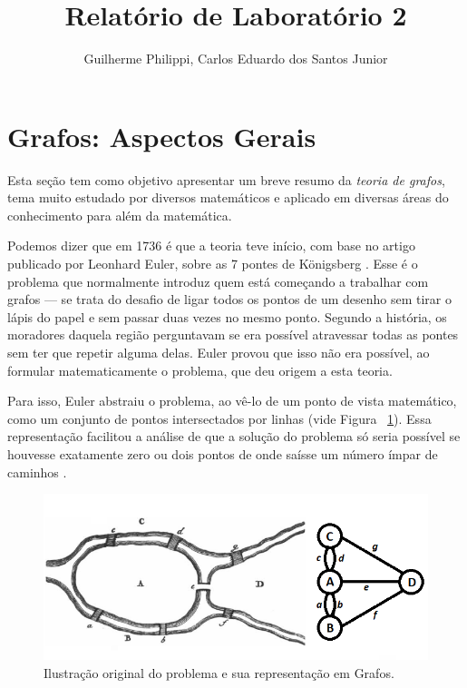\documentclass[a4paper,12pt]{article}
\title{Relatório de Laboratório 2}
\author{Guilherme Philippi, Carlos Eduardo dos Santos Junior}
\begin{document}
\maketitle
\tableofcontents

\section{Grafos: Aspectos Gerais\label{sec:grafos}}
Esta seção tem como objetivo apresentar um breve resumo da \textit{teoria de grafos}, tema muito estudado por diversos matemáticos e aplicado em diversas áreas do conhecimento para além da matemática.

Podemos dizer que em 1736 é que a teoria teve início, com base no artigo publicado por Leonhard Euler, sobre as 7 pontes de Königsberg \cite{euler:KOENIGSBERG} \cite{grafos1}. Esse é o problema que normalmente introduz quem está começando a trabalhar com grafos --- se trata do desafio de ligar todos os pontos de um desenho sem tirar o lápis do papel e sem passar duas vezes no mesmo ponto. Segundo a história, os moradores daquela região perguntavam se era possível atravessar todas as pontes sem ter que repetir alguma delas. Euler provou que isso não era possível, ao formular matematicamente o problema, que deu origem a esta teoria.

Para isso, Euler abstraiu o problema, ao vê-lo de um ponto de vista matemático, como um conjunto de pontos intersectados por linhas (vide Figura ~\ref{fig:koni}). Essa representação facilitou a análise de que a solução do problema só seria possível se houvesse exatamente zero ou dois pontos de onde saísse um número ímpar de caminhos \cite{euler:KOENIGSBERG}.

\begin{figure}[H]
	\begin{center}
		\includegraphics[width=0.85\linewidth]{koenigsbern.png}
	\end{center}
	\caption{Ilustração original do problema \cite{euler:KOENIGSBERG} e sua representação em Grafos.}
	\label{fig:koni}
\end{figure}
\end{document}
